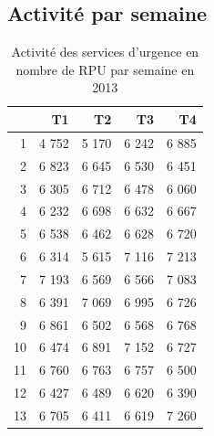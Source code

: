 \documentclass[12pt,english,french,twoside]{book}\usepackage[]{graphicx}\usepackage[]{color}
\begin{document}
\subsection*{Activité par semaine}

\begin{table}[ht]
\centering
\begin{tabular}{rrrrr}
  \hline
 & T1 & T2 & T3 & T4 \\ 
  \hline
1 & 4 752 & 5 170 & 6 242 & 6 885 \\ 
  2 & 6 823 & 6 645 & 6 530 & 6 451 \\ 
  3 & 6 305 & 6 712 & 6 478 & 6 060 \\ 
  4 & 6 232 & 6 698 & 6 632 & 6 667 \\ 
  5 & 6 538 & 6 462 & 6 628 & 6 720 \\ 
  6 & 6 314 & 5 615 & 7 116 & 7 213 \\ 
  7 & 7 193 & 6 569 & 6 566 & 7 083 \\ 
  8 & 6 391 & 7 069 & 6 995 & 6 726 \\ 
  9 & 6 861 & 6 502 & 6 568 & 6 768 \\ 
  10 & 6 474 & 6 891 & 7 152 & 6 727 \\ 
  11 & 6 760 & 6 763 & 6 757 & 6 500 \\ 
  12 & 6 427 & 6 489 & 6 620 & 6 390 \\ 
  13 & 6 705 & 6 411 & 6 619 & 7 260 \\ 
   \hline
\end{tabular}
\caption[Activité par semaine]{Activité des services d'urgence en nombre de RPU par semaine en 2013} 
\label{act_sem}
\end{table}
\end{document}
